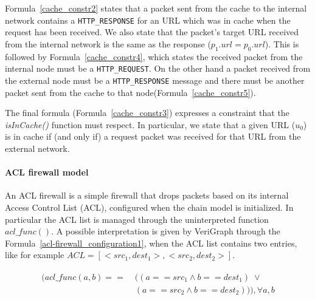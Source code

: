 Formula~\ref{cache_constr2} states that a packet sent from the cache to the internal network contains a \texttt{HTTP\_RESPONSE} for an URL which was in cache when the request has been received. We also state that the packet's  target URL  received from the internal network is the same as the response (\textit{$p_{1}.url = p_{0}.url$}). This is followed by Formula~\ref{cache_constr4}, which states the received packet from the internal node must be a  \texttt{HTTP\_REQUEST}. On the other hand a packet received from the external node must be a  \texttt{HTTP\_RESPONSE} message and there must be another packet sent from the cache to that node(Formula~\ref{cache_constr5}).

The final formula (Formula~\ref{cache_constr3}) expresses a constraint that the \textit{isInCache()} function must respect. In particular, we state that a given URL ($u_{0}$) is in cache if (and only if) a request packet was received for that URL from the external network.

\paragraph{ACL firewall model} An ACL firewall is a simple firewall that drops packets based on its internal Access Control List (ACL), configured when the chain model is initialized. In particular the ACL list is managed through the uninterpreted function \textit{$acl\_func()$}. A possible interpretation is given by VeriGraph through the Formula~\ref{acl-firewall_configuration1}, when the ACL list contains two entries, like for example \textit{$ACL = [<src_1, dest_1>,<src_2,dest_2>]$}.
	\begin{figure}[h]
		{\footnotesize
			\begin{subequations}
				\begin{align}
					\begin{split}
						\label{acl-firewall_configuration1}
						(acl\_func(a, b) == \;& ((a == src_1 \wedge b == dest_1 ) \; \vee \\
						& (a == src_2 \wedge b == dest_2))), \forall a, b
					\end{split}
				\end{align}
			\end{subequations}
		}%
	\end{figure}



